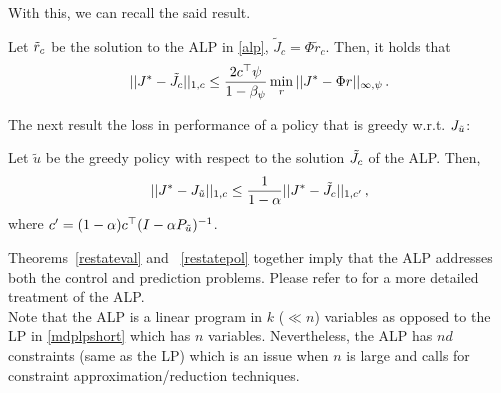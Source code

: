 With this, we can recall the said result.  %
\begin{theorem}
\label{restateval}
Let $\tilde{r}_c$ be the solution to the ALP in \eqref{alp}, $\tilde{J}_c=\Phi \tilde{r}_c$.
Then, it holds that
\begin{align*}
||J^*-\tilde{J}_c||_{1,c}\leq \frac{2c^\top \psi}{1-\beta_{\psi}}\min_{r}||J^*-\Phi r||_{\infty,\psi}\,.
\end{align*}
\end{theorem}
The next result  the loss in performance of a policy that is greedy w.r.t. $J_{\tilde{u}}$:
\begin{theorem}
\label{restatepol}
Let $\tilde{u}$ be the greedy policy with respect to the solution $\tilde{J}_c$ of the ALP. Then,
\begin{align*}
||J^*-J_{\tilde{u}}||_{1,c}\leq \frac{1}{1-\alpha}||J^*-\tilde{J}_c||_{1,c'}\,,
\end{align*}
where $c'=(1-\alpha)c^\top(I-\alpha P_{\tilde{u}})^{-1}$.
\end{theorem}
Theorems~\ref{restateval} and ~\ref{restatepol} together imply that the ALP addresses both the control and prediction problems. Please refer to \cite{ALP} for a more detailed treatment of the ALP.\\
Note that the ALP is a linear program in $k$ ($\ll n$) variables as opposed to the LP in \eqref{mdplpshort} which has $n$ variables. Nevertheless, the ALP has $nd$ constraints (same as the LP) which is an issue when $n$ is large and calls for constraint approximation/reduction techniques.
